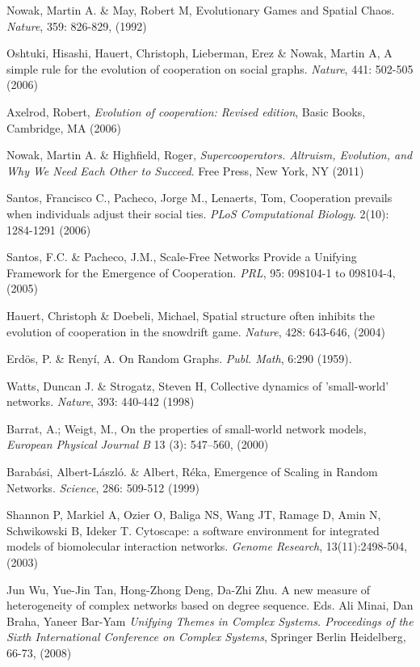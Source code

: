 \documentclass[11pt]{article}
\begin{document}
{\begin{thebibliography}{100}
 Nowak, Martin A. \& May, Robert M, Evolutionary
  Games and Spatial Chaos. \textit{Nature}, 359: 826-829, (1992)

 Oshtuki, Hisashi, Hauert, Christoph, Lieberman, Erez \& Nowak, Martin A, A simple rule for the evolution of cooperation on social graphs. \textit{Nature}, 441: 502-505 (2006)

 Axelrod, Robert, \textit{Evolution of cooperation: Revised edition}, Basic Books, Cambridge, MA (2006)

 Nowak, Martin A. \& Highfield, Roger,
  \textit{Supercooperators. Altruism, Evolution, and Why We Need Each
    Other to Succeed}. Free Press, New York, NY  (2011)

 Santos, Francisco C., Pacheco, Jorge M., Lenaerts, Tom, Cooperation prevails when individuals adjust their social ties. \textit{PLoS Computational Biology}. 2(10): 1284-1291 (2006)

 Santos, F.C. \& Pacheco, J.M., Scale-Free
  Networks Provide a Unifying Framework for the Emergence of
  Cooperation. \textit{PRL}, 95: 098104-1 to 098104-4, (2005) 

 Hauert, Christoph \& Doebeli, Michael, Spatial
  structure often inhibits the evolution of cooperation in the
  snowdrift game. \textit{Nature}, 428: 643-646,  (2004)

 Erd\"{o}s, P. \& Reny\'i, A. On Random Graphs. \textit{Publ. Math}, 6:290 (1959).

 Watts, Duncan J. \& Strogatz, Steven H, Collective dynamics
  of 'small-world' networks. \textit{Nature}, 393: 440-442 (1998)
  
   Barrat, A.; Weigt, M., On the properties of small-world network models, \textit{European Physical Journal B} 13 (3): 547–560, (2000)

 Barab\'asi, Albert-L\'aszl\'o. \& Albert, R\'eka, Emergence of Scaling in Random Networks. \textit{Science}, 286: 509-512 (1999)
  
 Shannon P, Markiel A, Ozier O, Baliga NS, Wang JT, Ramage D, Amin N, Schwikowski B, Ideker T. Cytoscape: a software environment for integrated models of biomolecular interaction networks. \textit{Genome Research}, 13(11):2498-504, (2003)

Jun Wu, Yue-Jin Tan, Hong-Zhong Deng, Da-Zhi Zhu. A new measure of heterogeneity of complex networks based on degree sequence.  Eds. Ali Minai, Dan Braha, Yaneer Bar-Yam  \emph{Unifying Themes in Complex Systems. Proceedings of the Sixth International Conference on Complex Systems}, Springer Berlin Heidelberg, 66-73, (2008)
  

\end{thebibliography}}
\end{document}
